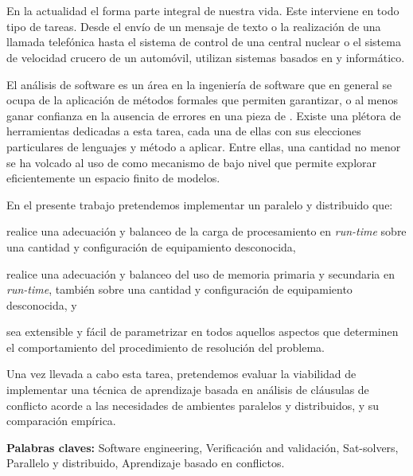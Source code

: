 
\chapter*{\runtitulo}

En la actualidad el \soft forma parte integral de nuestra vida. Este
interviene  en todo tipo de tareas. Desde el envío de un mensaje de texto o la
realización de una llamada telefónica hasta el sistema de control de una
central nuclear o el sistema de velocidad crucero de un automóvil, utilizan
sistemas basados en \hard y \soft informático.

El análisis de software es un área en la ingeniería de software que en general
se ocupa de la aplicación de métodos formales que permiten garantizar, o al
menos ganar confianza en la ausencia de errores en una pieza de \soft. Existe
una plétora de herramientas dedicadas a esta tarea, cada una de ellas con sus
elecciones particulares de lenguajes y método a aplicar. Entre ellas, una
cantidad no menor se ha volcado al uso de \ssolvers \ots como mecanismo de
bajo nivel que permite explorar eficientemente un espacio finito de modelos.

En el presente trabajo pretendemos implementar un \ssolver paralelo y
distribuido que: \begin{inparaenum}[a)]   \item realice una adecuación y
balanceo de la carga de procesamiento en \emph{run-time} sobre una cantidad y
configuración de equipamiento desconocida, \item realice una adecuación y
balanceo del uso de memoria primaria y secundaria en \emph{run-time}, también
sobre una cantidad y configuración de equipamiento desconocida, y  \item sea
extensible y fácil de parametrizar en todos aquellos aspectos que determinen
el comportamiento del procedimiento de resolución del problema.
\end{inparaenum} Una vez llevada a cabo esta tarea, pretendemos evaluar la
viabilidad de implementar una técnica de aprendizaje basada en análisis de
cláusulas de conflicto acorde a las necesidades de ambientes paralelos y
distribuidos, y su comparación empírica.

\bigskip

\noindent \textbf{Palabras claves:} Software engineering, Verificación and
validación, Sat-solvers, Parallelo y distribuido, Aprendizaje basado en
conflictos.
